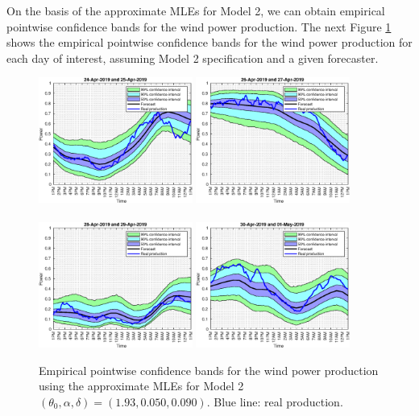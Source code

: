 \documentclass[11pt]{article}
\theoremstyle{definition}
\begin{document}
On the basis of the approximate MLEs for Model 2, we can obtain empirical pointwise confidence bands for the wind power production. The next Figure \ref{fig:confidence_bands} shows the empirical pointwise confidence bands for the wind power production for each day of interest, assuming Model 2 specification and a given forecaster.

\begin{figure}[H]
\centering
\includegraphics[width=0.45\textwidth]{../../MATLAB_Files/Results/bands_testing_days/optimal_value/withDate/1.eps}
\includegraphics[width=0.45\textwidth]{../../MATLAB_Files/Results/bands_testing_days/optimal_value/withDate/2.eps}\\
\quad\\
\includegraphics[width=0.45\textwidth]{../../MATLAB_Files/Results/bands_testing_days/optimal_value/withDate/3.eps}
\includegraphics[width=0.45\textwidth]{../../MATLAB_Files/Results/bands_testing_days/optimal_value/withDate/4.eps}
\caption{Empirical pointwise confidence bands for the wind power production using the approximate MLEs for Model 2 $(\theta_0, \alpha ,\delta)=(1.93,0.050,0.090)$. Blue line: real production.}
\label{fig:confidence_bands}
\end{figure}
\end{document}
